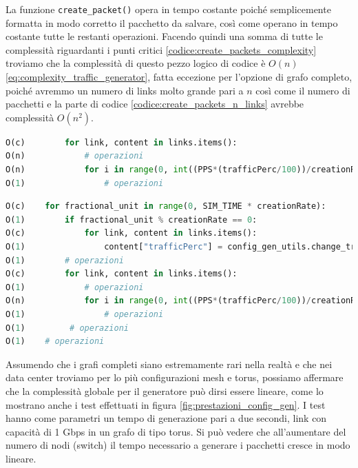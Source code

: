 \documentclass[binding=0.6cm]{sapthesis}
\begin{document}
La funzione \lstinline|create_packet()| opera in tempo costante poiché semplicemente formatta in modo corretto il pacchetto da salvare, così come operano in tempo costante tutte le restanti operazioni.
Facendo quindi una somma di tutte le complessità riguardanti i punti critici \ref{codice:create_packets_complexity} 
troviamo che la complessità di questo pezzo logico di codice è \(O(n)\) \ref{eq:complexity_traffic_generator}, fatta eccezione per l'opzione di grafo completo, poiché avremmo un numero di
links molto grande pari a \(n\) così come il numero di pacchetti e la parte di codice \ref{codice:create_packets_n_links} avrebbe complessità \(O(n^2)\).

{\scriptsize
\begin{lstlisting}[language=Python, basicstyle=\ttfamily, caption={Complessità per numero di links di un grafo completo}, label={codice:create_packets_n_links}, breaklines=true]
O(c)        for link, content in links.items():
O(n)            # operazioni
O(n)            for i in range(0, int((PPS*(trafficPerc/100))/creationRate)):
O(1)                # operazioni  
\end{lstlisting}
}



{\scriptsize
\begin{lstlisting}[language=Python, basicstyle=\ttfamily, caption={Complessità della logica di creazione pacchetti}, label={codice:create_packets_complexity}, breaklines=true]
O(c)    for fractional_unit in range(0, SIM_TIME * creationRate):
O(1)        if fractional_unit % creationRate == 0:
O(c)            for link, content in links.items():
O(1)                content["trafficPerc"] = config_gen_utils.change_traffic_perc(content["trafficPerc"], setup["trafficVariation"])
O(1)        # operazioni
O(c)        for link, content in links.items():
O(1)            # operazioni
O(n)            for i in range(0, int((PPS*(trafficPerc/100))/creationRate)):
O(1)                # operazioni
O(1)         # operazioni
O(1)    # operazioni
\end{lstlisting}
}

Assumendo che i grafi completi siano estremamente rari nella realtà e che nei data center troviamo per lo più configurazioni mesh e torus, possiamo
affermare che la complessità globale per il generatore può dirsi essere lineare, come lo mostrano anche i test effettuati in figura \ref{fig:prestazioni_config_gen}.
I test hanno come parametri un tempo di generazione pari a due secondi, link con capacità di 1 Gbps in un grafo di tipo torus.
Si può vedere che all'aumentare del numero di nodi (switch) il tempo necessario a generare i pacchetti cresce in modo lineare.
\end{document}
